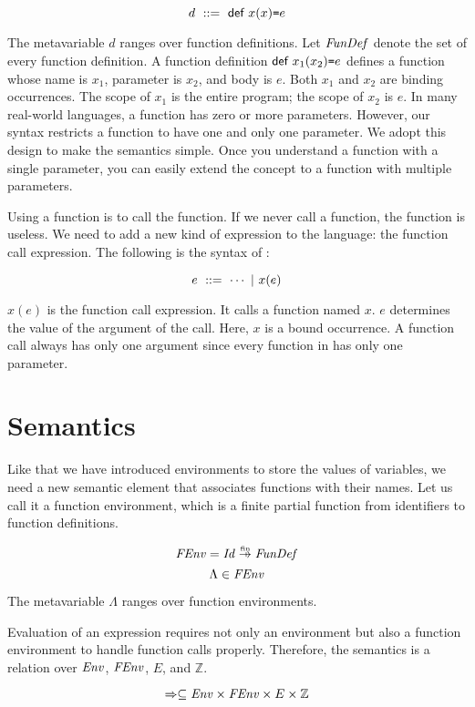 \[ d\ ::=\ \textsf{def}\ x(x)\texttt{=} e \]

The metavariable $d$ ranges over function definitions. Let $\mbox{\emph{FunDef}}$
denote the set of every function definition. A function definition
$\textsf{def}\ x_1(x_2)\texttt{=} e$ defines a function whose name is $x_1$, parameter is
$x_2$, and body is $e$. Both $x_1$ and $x_2$ are binding occurrences.
The scope of $x_1$ is the entire program; the scope of $x_2$ is $e$.
In many real-world languages, a function has zero or
more parameters. However, our syntax restricts a function to have one and only
one parameter. We adopt this design to make the semantics simple. Once you
understand a function with a single parameter, you can easily extend the concept
to a function with multiple parameters.

Using a function is to call the function. If we never call a function, the
function is useless. We need to add a new kind of expression to the language:
the function call expression. The following is the syntax of \lang:

\[ e\ ::=\ \cdots\ |\ \eappfo{x}{e} \]

$x(e)$ is the function call expression. It calls a function named $x$. $e$
determines the value of the argument of the call. Here, $x$ is a bound
occurrence. A function call always has only one argument since every function in
\lang has only one parameter.

\section{Semantics}

Like that we have introduced environments to store the values of variables,
we need a new semantic element that associates functions with their names.
Let us call it a function environment, which is a finite partial function from
identifiers to function definitions.

\[\embox{FEnv}=\embox{Id}\finto\embox{FunDef}\]
\[\Lambda\in\mbox{\emph{FEnv}}\]

The metavariable $\Lambda$ ranges over function environments.

Evaluation of an expression requires not only an environment but also a function
environment to handle function calls properly.
Therefore, the semantics is a relation over $\mbox{\emph{Env}}$,
$\mbox{\emph{FEnv}}$, $E$, and $\mathbb{Z}$.

\[\Rightarrow\subseteq\mbox{\emph{Env}}\times\mbox{\emph{FEnv}}\times E\times\mathbb{Z}\]


